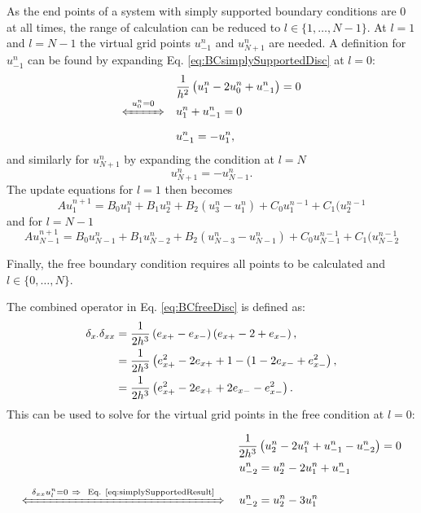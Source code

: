 As the end points of a system with simply supported boundary conditions are $0$ at all times, the range of calculation can be reduced to $l\in \{ 1, \hdots, N-1\}$. At $l=1$ and $l=N-1$ the virtual grid points $u_{-1}^n$ and $u_{N+1}^n$ are needed. A definition for $u_{-1}^n$ can be found by expanding Eq. \eqref{eq:BCsimplySupportedDisc} at $l = 0$:
\begin{align}
    &\frac{1}{h^2}\left(u_1^n - 2 u_0^n + u_{-1}^n\right) = 0\nonumber\\[-1em]
    \xLeftrightarrow{\mystrut\ u^n_0 = 0\ } \quad & u_1^n + u_{-1}^n = 0\nonumber\\[0.25em]
    &u_{-1}^n = -u_1^n,\label{eq:simplySupportedResult}
\end{align}
and similarly for $u_{N+1}^n$ by expanding the condition at $l=N$
\begin{equation*}
    u_{N+1}^n = -u_{N-1}^n.
\end{equation*}
The update equations for $l=1$ then becomes
\begin{equation}
    Au_1^{n+1} = B_0 u_1^n + B_1 u_2^n + B_2 (u_3^n - u_1^n) + C_0 u_1^{n-1} + C_1(u_2^{n-1} 
\end{equation}
and for $l=N-1$
\begin{equation}
    Au_{N-1}^{n+1} = B_0 u_{N-1}^n + B_1 u_{N-2}^n + B_2 (u_{N-3}^n - u_{N-1}^n) + C_0 u_{N-1}^{n-1} + C_1(u_{N-2}^{n-1}
\end{equation}

Finally, the free boundary condition requires all points to be calculated and $l\in\{0, \hdots, N\}$. 

The combined operator in Eq. \eqref{eq:BCfreeDisc} is defined as:
\begin{align}
    \delta_{x\cdot}\delta_{xx} &= \frac{1}{2h^3}\left(e_{x+}-e_{x-}\right)\left(e_{x+}-2+e_{x-}\right),\nonumber\\
    &=\frac{1}{2h^3}\left(e_{x+}^2 - 2e_{x+} + 1 - (1 - 2e_{x-} + e_{x-}^2\right),\nonumber\\
    &=\frac{1}{2h^3}\left(e_{x+}^2 - 2e_{x+} + 2e_{x-} -e_{x-}^2\right).
\end{align}
This can be used to solve for the virtual grid points in the free condition at $l=0$:

\begin{align*}
    \frac{1}{2h^3} &\left(u_2^n - 2 u_1^n + u_{-1}^n - u_{-2}^n\right) = 0\\
    u_{-2}^n &= u_2^n - 2 u_1^n + u_{-1}^n\\
    \xLeftrightarrow{\mystrut\ \dxx \uln = 0\ \Rightarrow\ \text{ Eq. \eqref{eq:simplySupportedResult}}\ }
    \quad u_{-2}^n &= u_2^n - 3 u_1^n 
\end{align*}

